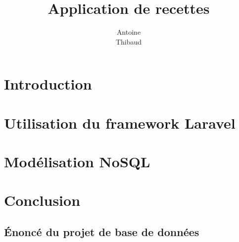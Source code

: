 \documentclass{scrreprt}
\title{Application de recettes}
\author{Antoine \bsc{Augusti}\\ Thibaud \bsc{Dauce}}
\begin{document}
	\tableofcontents

	\chapter{Introduction}
		

	\chapter{Utilisation du framework Laravel}
		

	\chapter{Modélisation NoSQL}
		

	\chapter{Conclusion}
		

	\begin{appendix}
		\chapter{Énoncé du projet de base de données} %
		\label{cha:enonce_du_projet_de_base_de_donnees}
			
	\end{appendix}


\end{document}
